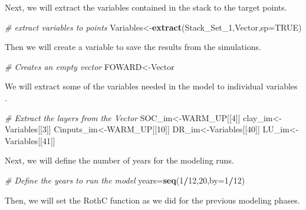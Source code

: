 \documentclass[
  10pt,
  b5paper,
]{book}
\newenvironment{Shaded}{\begin{snugshade}}{\end{snugshade}}
\newcommand{\CommentTok}[1]{\textcolor[rgb]{0.56,0.35,0.01}{\textit{#1}}}
\newcommand{\DataTypeTok}[1]{\textcolor[rgb]{0.13,0.29,0.53}{#1}}
\newcommand{\DecValTok}[1]{\textcolor[rgb]{0.00,0.00,0.81}{#1}}
\newcommand{\KeywordTok}[1]{\textcolor[rgb]{0.13,0.29,0.53}{\textbf{#1}}}
\newcommand{\NormalTok}[1]{#1}
\newcommand{\OperatorTok}[1]{\textcolor[rgb]{0.81,0.36,0.00}{\textbf{#1}}}
\newcommand{\OtherTok}[1]{\textcolor[rgb]{0.56,0.35,0.01}{#1}}
\begin{document}
Next, we will extract the variables contained in the stack to the target points.

\begin{Shaded}
\begin{Highlighting}[]
\CommentTok{# extract variables to points}
\NormalTok{Variables<-}\KeywordTok{extract}\NormalTok{(Stack_Set_}\DecValTok{1}\NormalTok{,Vector,}\DataTypeTok{sp=}\OtherTok{TRUE}\NormalTok{)}
\end{Highlighting}
\end{Shaded}

Then we will create a variable to save the results from the simulations.

\begin{Shaded}
\begin{Highlighting}[]
\CommentTok{# Creates an empty vector}
\NormalTok{FOWARD<-Vector}
\end{Highlighting}
\end{Shaded}

We will extract some of the variables needed in the model to individual variables .

\begin{Shaded}
\begin{Highlighting}[]
\CommentTok{# Extract the layers from the Vector}
\NormalTok{SOC_im<-WARM_UP[[}\DecValTok{4}\NormalTok{]]}
\NormalTok{clay_im<-Variables[[}\DecValTok{3}\NormalTok{]] }
\NormalTok{Cinputs_im<-WARM_UP[[}\DecValTok{10}\NormalTok{]] }
\NormalTok{DR_im<-Variables[[}\DecValTok{40}\NormalTok{]]}
\NormalTok{LU_im<-Variables[[}\DecValTok{41}\NormalTok{]]}
\end{Highlighting}
\end{Shaded}

Next, we will define the number of years for the modeling runs.

\begin{Shaded}
\begin{Highlighting}[]
\CommentTok{# Define the years to run the model}
\NormalTok{years=}\KeywordTok{seq}\NormalTok{(}\DecValTok{1}\OperatorTok{/}\DecValTok{12}\NormalTok{,}\DecValTok{20}\NormalTok{,}\DataTypeTok{by=}\DecValTok{1}\OperatorTok{/}\DecValTok{12}\NormalTok{)}
\end{Highlighting}
\end{Shaded}

Then, we will set the RothC function as we did for the previous modeling phases.
\end{document}
